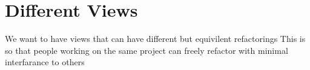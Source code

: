 
\chapter{Different Views}
We want to have views that can have different but equivilent refactorings
This is so that people working on the same project can freely refactor with minimal interfarance to others

